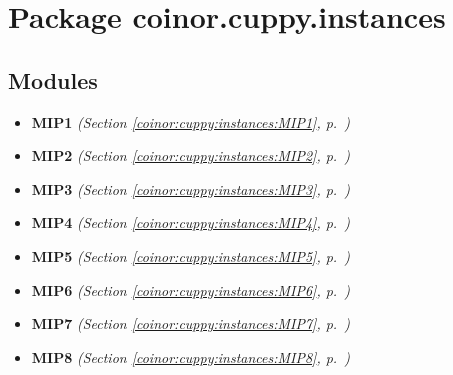 %
%
%


\section{Package coinor.cuppy.instances}

    \label{coinor:cuppy:instances}


\subsection{Modules}

\begin{itemize}
\setlength{\parskip}{0ex}
\item \textbf{MIP1}
  \textit{(Section \ref{coinor:cuppy:instances:MIP1}, p.~\pageref{coinor:cuppy:instances:MIP1})}

\item \textbf{MIP2}
  \textit{(Section \ref{coinor:cuppy:instances:MIP2}, p.~\pageref{coinor:cuppy:instances:MIP2})}

\item \textbf{MIP3}
  \textit{(Section \ref{coinor:cuppy:instances:MIP3}, p.~\pageref{coinor:cuppy:instances:MIP3})}

\item \textbf{MIP4}
  \textit{(Section \ref{coinor:cuppy:instances:MIP4}, p.~\pageref{coinor:cuppy:instances:MIP4})}

\item \textbf{MIP5}
  \textit{(Section \ref{coinor:cuppy:instances:MIP5}, p.~\pageref{coinor:cuppy:instances:MIP5})}

\item \textbf{MIP6}
  \textit{(Section \ref{coinor:cuppy:instances:MIP6}, p.~\pageref{coinor:cuppy:instances:MIP6})}

\item \textbf{MIP7}
  \textit{(Section \ref{coinor:cuppy:instances:MIP7}, p.~\pageref{coinor:cuppy:instances:MIP7})}

\item \textbf{MIP8}
  \textit{(Section \ref{coinor:cuppy:instances:MIP8}, p.~\pageref{coinor:cuppy:instances:MIP8})}

\end{itemize}


